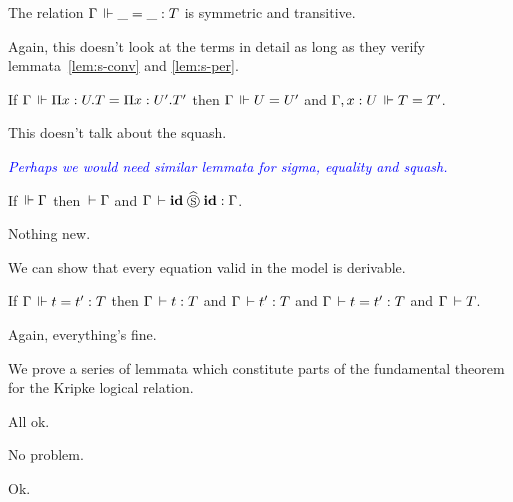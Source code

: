 \documentclass[a4paper,english]{lipics-utf8x}
\newcommand\meta[1]{\noindent\textcolor{blue}{\emph{#1}}}
\begin{document}
  \begin{lemma}
    The relation $\Gamma \,\Vdash \_ = \_ : T$ is symmetric and transitive.
  \end{lemma}
  Again, this doesn't look at the terms in detail as long as they verify
  lemmata~\ref{lem:s-conv} and \ref{lem:s-per}.

  \begin{lemma}
    \label{lem:fun-inj-valid}
    If $\Gamma \,\Vdash \Pi x:U.T = \Pi x:U'.T'$ then $\Gamma \,\Vdash U = U'$ and
    $\Gamma, x:U \,\Vdash T = T'$.
  \end{lemma}
  This doesn't talk about the squash.

  \meta{Perhaps we would need similar lemmata for sigma, equality and squash.}

  \begin{lemma}
    If $\,\Vdash \Gamma$ then $\,\vdash \Gamma$ and $\Gamma \,\vdash \operatorname{\mathbf{id}} \mathrel{\widehat{\mathrel{\circledS}}} \operatorname{\mathbf{id}} : \Gamma$.
  \end{lemma}
  Nothing new.

  We can show that every equation valid in the model is derivable.
  \begin{lemma}
    If $\Gamma \,\Vdash t = t' : T$ then $\Gamma \,\vdash t : T$ and
    $\Gamma \,\vdash t' : T$ and $\Gamma \,\vdash t = t' : T$ and $\Gamma \,\vdash T$.
  \end{lemma}
  Again, everything's fine.

  We prove a series of lemmata which constitute parts of the fundamental theorem
  for the Kripke logical relation.

  \begin{lemma}
    \leavevmode
    \begin{mathc}
    \end{mathc}
  \end{lemma}
  All ok.

  \begin{lemma}
    \leavevmode
    \begin{mathc}
    \end{mathc}
  \end{lemma}
  No problem.

  \begin{lemma}
    \leavevmode
    \begin{mathc}
    \end{mathc}
  \end{lemma}
  Ok.
\end{document}
